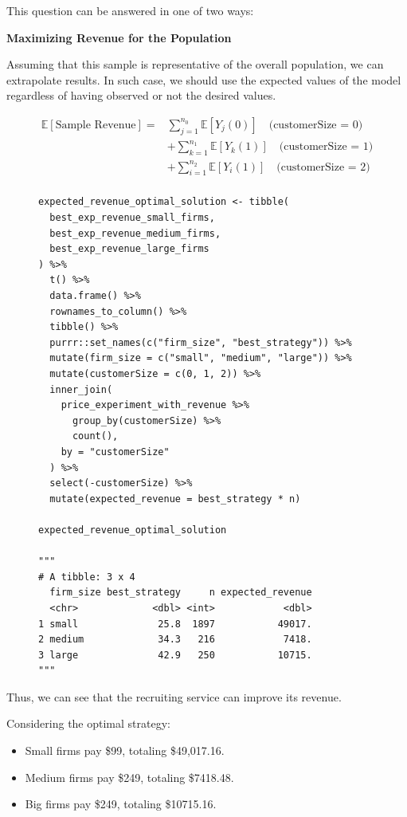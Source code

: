 \documentclass{article}
\begin{document}
This question can be answered in one of two ways:

\textbf{Maximizing Revenue for the Population}

Assuming that this sample is representative of the overall population, we can extrapolate results. In such case, we should use the expected values of the model regardless of having observed or not the desired values.

\begin{align*}
    \mathbb{E}[\text{Sample Revenue}] =&
    \sum_{j = 1}^{n_0} \mathbb{E}[Y_j(0)] \quad \text{(customerSize = 0)} \\
    & + \sum_{k = 1}^{n_1} \mathbb{E}[Y_k(1)] \quad \text{(customerSize = 1)} \\
    & + \sum_{i = 1}^{n_2} \mathbb{E}[Y_i(1)] \quad \text{(customerSize = 2)} \\
\end{align*}

\begin{figure}[H]
\centering
\begin{lstlisting}[style=Rstyle, caption=Difference in Means by Customer Size]
expected_revenue_optimal_solution <- tibble(
  best_exp_revenue_small_firms,
  best_exp_revenue_medium_firms,
  best_exp_revenue_large_firms
) %>% 
  t() %>% 
  data.frame() %>% 
  rownames_to_column() %>% 
  tibble() %>% 
  purrr::set_names(c("firm_size", "best_strategy")) %>% 
  mutate(firm_size = c("small", "medium", "large")) %>% 
  mutate(customerSize = c(0, 1, 2)) %>% 
  inner_join(
    price_experiment_with_revenue %>% 
      group_by(customerSize) %>% 
      count(),
    by = "customerSize"
  ) %>% 
  select(-customerSize) %>% 
  mutate(expected_revenue = best_strategy * n)

expected_revenue_optimal_solution

"""
# A tibble: 3 x 4
  firm_size best_strategy     n expected_revenue
  <chr>             <dbl> <int>            <dbl>
1 small              25.8  1897           49017.
2 medium             34.3   216            7418.
3 large              42.9   250           10715.
"""
\end{lstlisting}
\end{figure}

Thus, we can see that the recruiting service can improve its revenue.

Considering the optimal strategy:
\begin{itemize}
    \item Small firms pay \$99, totaling \$49,017.16.
    \item Medium firms pay \$249, totaling \$7418.48.
    \item Big firms pay \$249, totaling \$10715.16.
\end{itemize}
\end{document}
